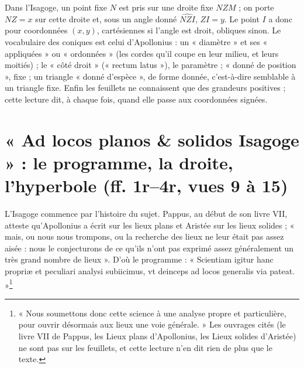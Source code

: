 \documentclass[11pt,a4paper]{article}
\begin{document}
Dans l'Isagoge, un point fixe $N$ est pris sur une droite fixe $NZM$ ; on porte
$NZ = x$ sur cette droite et, sous un angle donné $\widehat{NZI}$, $ZI = y$. Le
point $I$ a donc pour coordonnées $(x,y)$, cartésiennes si l'angle est droit,
obliques sinon. Le vocabulaire des coniques est celui d'Apollonius : un
« diamètre » et ses « appliquées » ou « ordonnées » (les cordes qu'il coupe en
leur milieu, et leurs moitiés) ; le « côté droit » (« rectum latus »), le
paramètre ; « donné de position », fixe ; un triangle « donné d'espèce », de
forme donnée, c'est-à-dire semblable à un triangle fixe. Enfin les feuillets
ne connaissent que des grandeurs positives ; cette lecture dit, à chaque fois,
quand elle passe aux coordonnées signées.

\section*{« Ad locos planos \& solidos Isagoge » : le programme, la droite, l'hyperbole (ff. 1r–4r, vues 9 à 15)}

L'Isagoge commence par l'histoire du sujet. Pappus, au début de son livre VII,
atteste qu'Apollonius a écrit sur les lieux plans et Aristée sur les lieux
solides ; « mais, ou nous nous trompons, ou la recherche des lieux ne leur
était pas assez aisée : nous le conjecturons de ce qu'ils n'ont pas exprimé
assez généralement un très grand nombre de lieux ». D'où le programme :
« Scientiam igitur hanc propriæ et peculiari analysi subiicimus, vt deinceps ad
locos generalis via pateat. »\footnote{« Nous soumettons donc cette science à
une analyse propre et particulière, pour ouvrir désormais aux lieux une voie
générale. » Les ouvrages cités (le livre VII de Pappus, les Lieux plans
d'Apollonius, les Lieux solides d'Aristée) ne sont pas sur les feuillets, et
cette lecture n'en dit rien de plus que le texte.}
\end{document}
